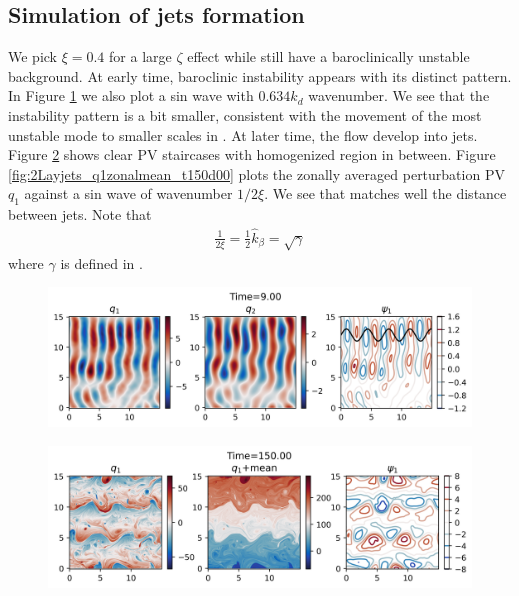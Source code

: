 \subsection{Simulation of jets formation}
We pick $\xi = 0.4$ for a large $\zeta$ effect while still have a baroclinically unstable background. At early time, baroclinic instability appears with its distinct pattern. In Figure \ref{fig:2Layjets_q1_t9d00} we also plot a sin wave with $0.634k_d$ wavenumber. We see that the instability pattern is a bit smaller, consistent with the movement of the most unstable mode to smaller scales in \cite[Fig. 9.14]{Vallis_17}. At later time, the flow develop into jets. Figure \ref{fig:2Layjets_q1_t150d00} shows clear PV staircases with homogenized region in between. Figure \ref{fig:2Layjets_q1zonalmean_t150d00} plots the zonally averaged perturbation PV $q_1$ against a sin wave of wavenumber $1/2\xi$. We see that matches well the distance between jets. Note that
\begin{align}
    \frac{1}{2\xi} = \frac{1}{2}\hat{k}_\beta = \sqrt{\gamma}
\end{align}
where $\gamma$ is defined in \cite[(9.115)]{Vallis_17}. 

\begin{figure}
    \centering
    \includegraphics[width=\textwidth]{2Layjets_q1_t9d00}
    \caption{}
    \label{fig:2Layjets_q1_t9d00}
\end{figure}


\begin{figure}
    \centering
    \includegraphics[width=\textwidth]{2Layjets_q1_t150d00}
    \caption{}
    \label{fig:2Layjets_q1_t150d00}
\end{figure}

